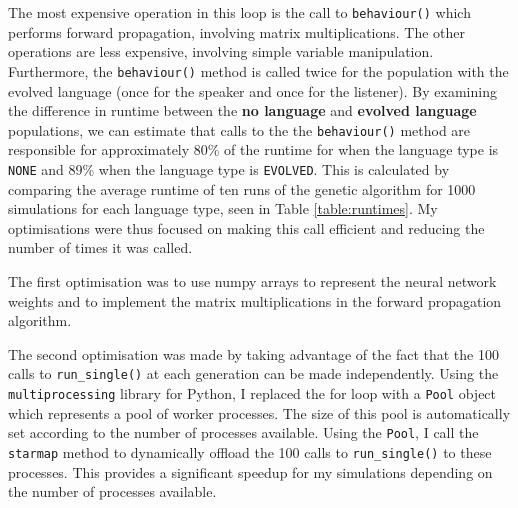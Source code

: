 \documentclass[12pt,a4paper]{report}
\begin{document}
The most expensive operation in this loop is the call to \texttt{behaviour()} which performs forward propagation, involving matrix multiplications. The other operations are less expensive, involving simple variable manipulation. Furthermore, the \texttt{behaviour()} method is called twice for the population with the evolved language (once for the speaker and once for the listener). By examining the difference in runtime between the {\bf no language} and {\bf evolved language} populations, we can estimate that calls to the the \texttt{behaviour()} method are responsible for approximately 80\% of the runtime for when the language type is \texttt{NONE} and 89\% when the language type is \texttt{EVOLVED}. This is calculated by comparing the average runtime of ten runs of the genetic algorithm for 1000 simulations for each language type, seen in Table \ref{table:runtimes}. My optimisations were thus focused on making this call efficient and reducing the number of times it was called.

The first optimisation was to use numpy arrays to represent the neural network weights and to implement the matrix multiplications in the forward propagation algorithm. 

The second optimisation was made by taking advantage of the fact that the 100 calls to \texttt{run\_single()} at each generation can be made independently. Using the \texttt{multiprocessing} library for Python, I replaced the for loop with a \texttt{Pool} object which represents a pool of worker processes. The size of this pool is automatically set according to the number of processes available. Using the \texttt{Pool}, I call the \texttt{starmap} method to dynamically offload the 100 calls to \texttt{run\_single()} to these processes. This provides a significant speedup for my simulations depending on the number of processes available. 

\end{document}

